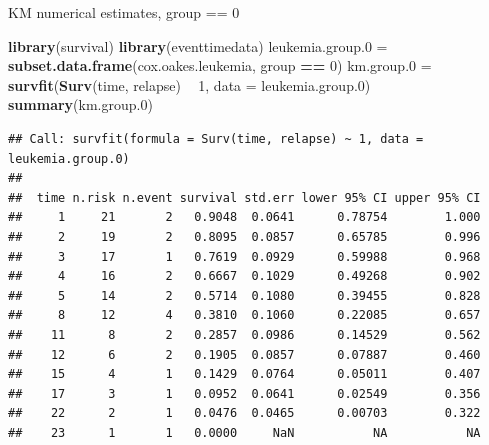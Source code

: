 \documentclass[ignorenonframetext,]{beamer}
\newenvironment{Shaded}{\begin{snugshade}}{\end{snugshade}}
\newcommand{\DataTypeTok}[1]{\textcolor[rgb]{0.13,0.29,0.53}{#1}}
\newcommand{\DecValTok}[1]{\textcolor[rgb]{0.00,0.00,0.81}{#1}}
\newcommand{\FloatTok}[1]{\textcolor[rgb]{0.00,0.00,0.81}{#1}}
\newcommand{\KeywordTok}[1]{\textcolor[rgb]{0.13,0.29,0.53}{\textbf{#1}}}
\newcommand{\NormalTok}[1]{#1}
\newcommand{\OperatorTok}[1]{\textcolor[rgb]{0.81,0.36,0.00}{\textbf{#1}}}
\newcommand{\StringTok}[1]{\textcolor[rgb]{0.31,0.60,0.02}{#1}}
\begin{document}
\begin{frame}[fragile]{%
\protect\hypertarget{km-numerical-estimates-group-0}{%
KM numerical estimates, group == 0}}

\scriptsize

\begin{Shaded}
\begin{Highlighting}[]
\KeywordTok{library}\NormalTok{(survival)}
\KeywordTok{library}\NormalTok{(eventtimedata)}
\NormalTok{leukemia.group}\FloatTok{.0}\NormalTok{ =}\StringTok{ }
\StringTok{  }\KeywordTok{subset.data.frame}\NormalTok{(cox.oakes.leukemia, group }\OperatorTok{==}\StringTok{ }\DecValTok{0}\NormalTok{)}
\NormalTok{km.group}\FloatTok{.0}\NormalTok{ =}\StringTok{ }\KeywordTok{survfit}\NormalTok{(}\KeywordTok{Surv}\NormalTok{(time, relapse) }\OperatorTok{~}\StringTok{ }\DecValTok{1}\NormalTok{, }
                     \DataTypeTok{data =}\NormalTok{ leukemia.group}\FloatTok{.0}\NormalTok{)}
\KeywordTok{summary}\NormalTok{(km.group}\FloatTok{.0}\NormalTok{)}
\end{Highlighting}
\end{Shaded}

\begin{verbatim}
## Call: survfit(formula = Surv(time, relapse) ~ 1, data = leukemia.group.0)
## 
##  time n.risk n.event survival std.err lower 95% CI upper 95% CI
##     1     21       2   0.9048  0.0641      0.78754        1.000
##     2     19       2   0.8095  0.0857      0.65785        0.996
##     3     17       1   0.7619  0.0929      0.59988        0.968
##     4     16       2   0.6667  0.1029      0.49268        0.902
##     5     14       2   0.5714  0.1080      0.39455        0.828
##     8     12       4   0.3810  0.1060      0.22085        0.657
##    11      8       2   0.2857  0.0986      0.14529        0.562
##    12      6       2   0.1905  0.0857      0.07887        0.460
##    15      4       1   0.1429  0.0764      0.05011        0.407
##    17      3       1   0.0952  0.0641      0.02549        0.356
##    22      2       1   0.0476  0.0465      0.00703        0.322
##    23      1       1   0.0000     NaN           NA           NA
\end{verbatim}

\end{frame}
\end{document}
